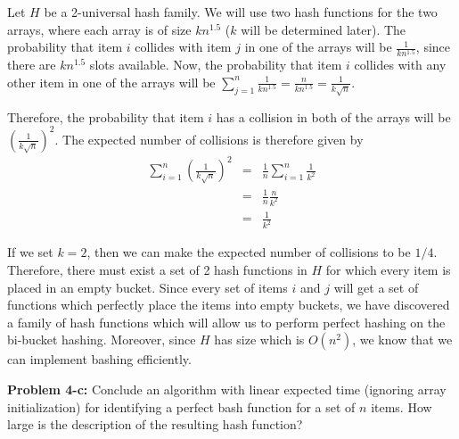 \documentclass[psamsfonts]{amsart}
\newenvironment{sol}{\vspace{0.25cm}{\large \bfseries Solution:}}{\qedsymbol}
\newenvironment{prob}[1]{\begin{framed}{\large \bfseries Problem #1:}}{\end{framed}}
\begin{document}
\begin{sol}
Let $H$ be a 2-universal hash family. We will use two hash functions for the two arrays, where each array is of size $kn^{1.5}$ ($k$ will be determined later). The probability that item $i$ collides with item $j$ in one of the arrays will be $\frac{1}{kn^{1.5}}$, since there are $kn^{1.5}$ slots available. Now, the probability that item $i$ collides with any other item in one of the arrays will be $\sum_{j=1}^n \frac{1}{kn^{1.5}} = \frac{n}{kn^{1.5}} = \frac{1}{k \sqrt{n}}$. 

Therefore, the probability that item $i$ has a collision in both of the arrays will be $\left( \frac{1}{k \sqrt{n}} \right)^2$. The expected number of collisions is therefore given by
\begin{eqnarray}
\sum_{i=1}^n \left( \frac{1}{k\sqrt{n}} \right)^2 &=& \frac{1}{n} \sum_{i=1}^n \frac{1}{k^2} \\
&=& \frac{1}{n} \frac{n}{k^2} \\
&=& \frac{1}{k^2}
\end{eqnarray}

If we set $k=2$, then we can make the expected number of collisions to be $1/4$. Therefore, there must exist a set of 2 hash functions in $H$ for which every item is placed in an empty bucket. Since every set of items $i$ and $j$ will get a set of functions which perfectly place the items into empty buckets, we have discovered a family of hash functions which will allow us to perform perfect hashing on the bi-bucket hashing. Moreover, since $H$ has size which is $O(n^2)$, we know that we can implement bashing efficiently.
\end{sol}

\begin{prob}{4-c}
Conclude an algorithm with linear expected time (ignoring array initialization) for identifying a perfect bash function for a set of $n$ items. How large is the description of the resulting hash function?
\end{prob}
\end{document}
